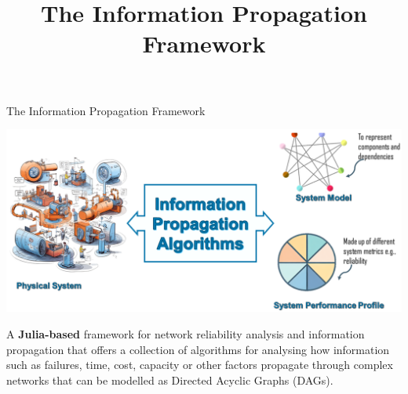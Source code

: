 \documentclass[aspectratio=169]{beamer}
\title[IPA Framework]{The Information Propagation Framework}
\begin{document}
\begin{frame}
\titlepage
\end{frame}


\begin{frame}{The Information Propagation Framework}
\begin{center}
\includegraphics[height=0.5\textheight]{IPA.png}
\end{center}
\begin{block}{}
A \textcolor{juliagreen}{\textbf{Julia-based}} framework for network reliability analysis and information propagation that offers a collection of algorithms for analysing how information such as failures, time, cost, capacity or other factors propagate through complex networks that can be modelled as Directed Acyclic Graphs (DAGs).
\end{block}
\end{frame}
\end{document}
